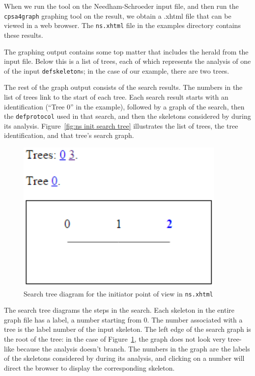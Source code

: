 When we run the {\cpsa} tool on the Needham-Schroeder input file, and
then run the \texttt{cpsa4graph} graphing tool on the result, we obtain
a .xhtml file that can be viewed in a web browser.  The
\texttt{ns.xhtml} file in the examples directory contains these
results.

 The graphing output contains some top matter that
includes the herald from the input file.  Below this is a list of
trees, each
of which represents the analysis of one of the input
\texttt{defskeleton}s; in the case of our example, there are two
trees.

The rest of the graph output consists of the search results.  The
numbers in the list of trees link to the start of each tree.  Each
search result starts with an identification (``Tree 0'' in the
example), followed by a graph of the search, then the
\texttt{defprotocol} used in that search, and then the skeletons
considered by {\cpsa} during its analysis.  Figure~\ref{fig:ns init
  search tree} illustrates the list of trees, the tree identification,
and that tree's search graph.

\begin{figure}
\centering
\includegraphics[scale=0.8]{ns_search_tree}
\caption[Needham-Schroeder search tree]{Search tree diagram for the
  initiator point of view in \texttt{ns.xhtml}}
\label{fig:ns init search tree}
\end{figure}

The search tree diagrams the steps in the search.  Each skeleton in
the entire graph file has a  label, a number starting
from 0.  The number associated with a tree is the label number of the
input skeleton.  The left edge of the search graph is the root of the tree:
in the case of Figure~\ref{fig:ns init search tree}, the graph does
not look very tree-like because the analysis doesn't branch.  The
numbers in the graph are the labels of the skeletons
considered by {\cpsa} during its analysis, and clicking on a number
will direct the browser to display the corresponding skeleton.

